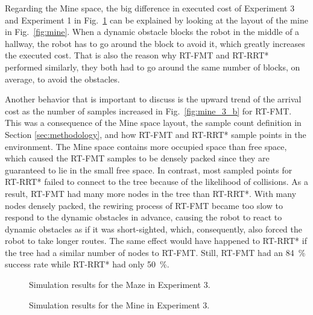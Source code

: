 Regarding the Mine space, the big difference in executed cost of Experiment 3 and Experiment 1 in Fig.~\ref{fig:mine_3} can be explained by looking at the layout of the mine in Fig.~\ref{fig:mine}. When a dynamic obstacle blocks the robot in the middle of a hallway, the robot has to go around the block to avoid it, which greatly increases the executed cost. That is also the reason why RT-FMT and RT-RRT* performed similarly, they both had to go around the same number of blocks, on average, to avoid the obstacles.

Another behavior that is important to discuss is the upward trend of the arrival cost as the number of samples increased in Fig.~\ref{fig:mine_3_b} for RT-FMT. This was a consequence of the Mine space layout, the sample count definition in Section \ref{sec:methodology}, and how RT-FMT and RT-RRT* sample points in the environment. The Mine space contains more occupied space than free space, which caused the RT-FMT samples to be densely packed since they are guaranteed to lie in the small free space. In contrast, most sampled points for RT-RRT* failed to connect to the tree because of the likelihood of collisions. As a result, RT-FMT had many more nodes in the tree than RT-RRT*. With many nodes densely packed, the rewiring process of RT-FMT became too slow to respond to the dynamic obstacles in advance, causing the robot to react to dynamic obstacles as if it was short-sighted, which, consequently, also forced the robot to take longer routes. The same effect would have happened to RT-RRT* if the tree had a similar number of nodes to RT-FMT. Still, RT-FMT had an 84~\% success rate while RT-RRT* had only 50~\%.

\begin{figure}
\centering
{}
\caption{Simulation results for the Maze in Experiment 3.}
\label{fig:maze_3}
\centering
{}
\caption{Simulation results for the Mine in Experiment 3.}
\label{fig:mine_3}
\end{figure}

